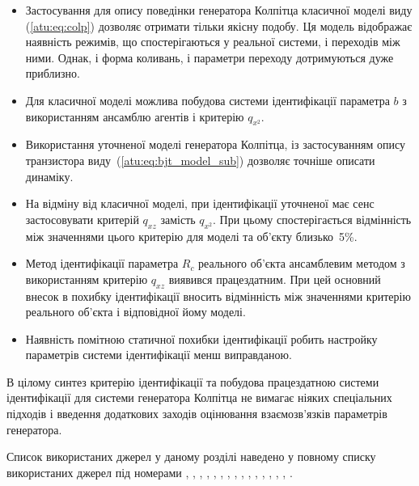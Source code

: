 \begin{itemize}

  \item
    Застосування для опису поведінки генератора Колпітца
    класичної моделі виду (\ref{atu:eq:colp}) дозволяє отримати тільки
    якісну подобу. Ця модель відображає наявність режимів, що
    спостерігаються у реальної системи, і переходів між ними. Однак,
    і форма коливань, і параметри переходу дотримуються дуже
    приблизно.

  \item
    Для класичної моделі можлива побудова системи ідентифікації
    параметра
    $b$ з використанням ансамблю агентів і критерію
    $q_{x^2} $.

  \item
    Використання уточненої моделі генератора Колпітца, із
    застосуванням опису транзистора виду~(\ref{atu:eq:bjt_model_sub}) дозволяє
    точніше описати динаміку.

  \item
    На відміну від класичної моделі, при ідентифікації уточненої
    має сенс застосовувати критерій
    $q_{xz} $ замість
    $q_{x^2} $. При цьому спостерігається відмінність між значеннями
    цього критерію для моделі та об'єкту близько~5\%.

  \item
    Метод ідентифікації параметра
    $R_c$ реального об'єкта ансамблевим методом з використанням
    критерію
    $q_{xz}$ виявився працездатним. При цей основний внесок в похибку
    ідентифікації вносить відмінність між значеннями критерію
    реального об'єкта і відповідної йому моделі.

  \item
    Наявність помітною статичної похибки ідентифікації робить
    настройку параметрів системи ідентифікації менш виправданою.

\end{itemize}


В цілому синтез критерію ідентифікації та побудова працездатною
системи ідентифікації для системи генератора Колпітца
не вимагає ніяких спеціальних підходів і введення
додаткових заходів оцінювання взаємозв'язків параметрів
генератора.

Список використаних джерел у даному розділі наведено у повному
списку використаних джерел під номерами
\cite{atu_apir2013},
\cite{atu_st104a},
\cite{DBLP:journals/corr/WangWQ15},
\cite{dmitriev_gen_chaos},
\cite{doi:10.1063/1.4705999},
\cite{gummel_poon_1970},
\cite{shiskin_electronnie_pribori},
\cite{horowitz},
\cite{kennedy_chaos_colpitts},
\cite{atu_asau21},
\cite{Kennedy_Colpitts_predicting},
\cite{Kennedy_Colpitts_Chua},
\cite{PhysRevE.80.016201},
\cite{picovskii_syncro},
\cite{bonetti_super_persistent_colpitts},
\cite{zaeplnii_radio_calc}.


